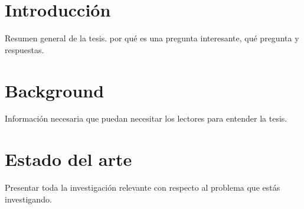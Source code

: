 \documentclass[11pt,a4paper,twoside]{tesis}
\begin{document}

\def\autor{Fernando Gasperi Jabalera}
\def\tituloTesis{Refactorings automáticos de alto nivel}
\def\runtitulo{Refactorings automáticos de alto nivel}
\def\runtitle{High level automated refactorings}
\def\director{Hernán Wilkinson}
\def\lugar{Buenos Aires, 2020}


\frontmatter
\pagestyle{empty}


\cleardoublepage

\cleardoublepage

\cleardoublepage

\cleardoublepage
\tableofcontents

\mainmatter
\pagestyle{headings}


\chapter{Introducción}
Resumen general de la tesis. por qué es una pregunta interesante, qué pregunta y respuestas.


\chapter{Background}
Información necesaria que puedan necesitar los lectores para entender la tesis.


\chapter{Estado del arte}
Presentar toda la investigación relevante con respecto al problema que estás investigando.


\backmatter
%
\end{document}
